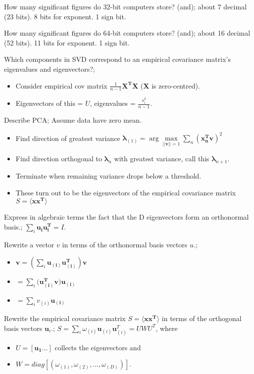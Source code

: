 \documentclass{article}
\begin{document}
How many significant figures do 32-bit computers store? (and); about 7 decimal (23 bits). 8 bits for exponent. 1 sign bit.

How many significant figures do 64-bit computers store? (and); about 16 decimal (52 bits). 11 bits for exponent. 1 sign bit.

Which components in SVD correspond to an empirical covariance matrix's eigenvalues and eigenvectors?; \begin{itemize} \item Consider empirical cov matrix $\frac{1}{n-1}\mathbf{X^TX}$ ($\mathbf{X}$ is zero-centred). \item Eigenvectors of this = $U$, eigenvalues = $\frac{s_i^2}{n-1}$. \end{itemize}

Describe PCA; Assume data have zero mean. \begin{itemize} \item Find direction of greatest variance $\mathbf{\lambda}_{(1)}=\arg\max\limits_{||\mathbf{v}||=1}\sum_n(\mathbf{x^T_nv})^2$ \item Find direction orthogonal to $\mathbf{\lambda}_{n}$ with greatest variance, call this  $\mathbf{\lambda}_{n+1}$.  \item Terminate when remaining variance drops below a threshold.  \item These turn out to be the eigenvectors of the empirical covariance matrix $S=\langle \mathbf{xx^T} \rangle$ \end{itemize}

Express in algebraic terms the fact that the D eigenvectors form an orthonormal basis.; $\sum_i\mathbf{u_{i}u_{i}^T}=I$.

Rewrite a vector $v$ in terms of the orthonormal basis vectors $u$.; \begin{itemize} \item $\mathbf{v}=(\sum_i \mathbf{u_{(i)}u_{(i)}^T})\mathbf{v}$ \item $=\sum_i (\mathbf{u_{(i)}^Tv)u_{(i)}}$ \item $=\sum_i v_{(i)}\mathbf{u_{(i)}}$ \end{itemize}

Rewrite the empirical covariance matrix $S=\langle \mathbf{xx^T} \rangle$ in terms of the orthogonal basis vectors $\mathbf{u}_i$.; $S=\sum_i \omega_{(i)}\mathbf{u}_{(i)}\mathbf{u}_{(i)}^T = UWU^T$, where \begin{itemize} \item $U=[\mathbf{u_{1}}...]$ collects the eigenvectors and \item $W = diag[(\omega_{(1)}, \omega_{(2)},...,\omega_{(D)})]$.  \end{itemize}
\end{document}
